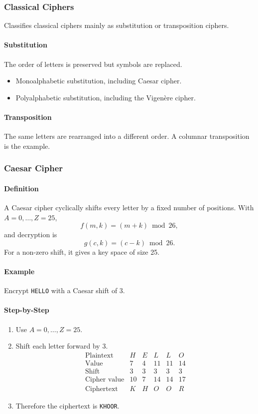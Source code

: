 \documentclass[12pt]{article}
\newcommand{\Definition}{\paragraph{Definition}}
\newcommand{\Step}{\paragraph{Step-by-Step}}
\newcommand{\Example}{\paragraph{Example}}
\begin{document}
\subsubsection{Classical Ciphers}
Classifies classical ciphers mainly as substitution or transposition ciphers.

\paragraph{Substitution}
The order of letters is preserved but symbols are replaced.
\begin{itemize}
    \item Monoalphabetic substitution, including Caesar cipher.
    \item Polyalphabetic substitution, including the Vigen\`ere cipher.
\end{itemize}

\paragraph{Transposition}
The same letters are rearranged into a different order. A columnar transposition is the example.

\subsubsection{Caesar Cipher}
\Definition A Caesar cipher cyclically shifts every letter by a fixed number of positions. With $A=0,\ldots,Z=25$,
\[
f(m,k)=(m+k)\bmod 26,
\]
and decryption is
\[
g(c,k)=(c-k)\bmod 26.
\]
For a non-zero shift, it gives a key space of size 25.

\Example Encrypt \texttt{HELLO} with a Caesar shift of $3$.

\Step
\begin{enumerate}
    \item Use $A=0,\ldots,Z=25$.
    \item Shift each letter forward by $3$.
    \[
    \begin{array}{c|ccccc}
    \text{Plaintext} & H & E & L & L & O\\
    \hline
    \text{Value} & 7 & 4 & 11 & 11 & 14\\
    \text{Shift} & 3 & 3 & 3 & 3 & 3\\
    \text{Cipher value} & 10 & 7 & 14 & 14 & 17\\
    \text{Ciphertext} & K & H & O & O & R
    \end{array}
    \]
    \item Therefore the ciphertext is \texttt{KHOOR}.
\end{enumerate}
\end{document}
